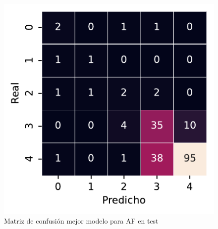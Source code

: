\begin{figure}[htbp]
    \vspace{1.5em} %

    \includegraphics[width=0.75\linewidth]{figures/5_experiments/multi-af-cm.pdf}
    \caption{Matriz de confusión mejor modelo para AF en test}
    \label{fig5:AF_confusion_matrix}
\end{figure}

